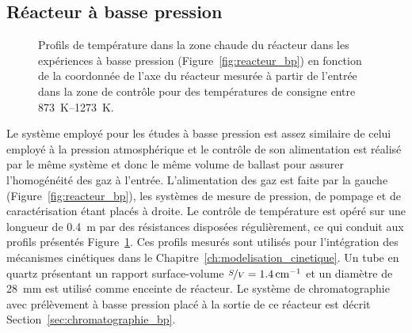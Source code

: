 \subsection{Réacteur à basse pression}
\label{sec:reacteur_bp}

\begin{figure}[!b]
  \centering{}
  
  \caption{\label{fig:temperature_profiles_bp}Profils de température dans la zone chaude du réacteur dans les expériences à basse pression (Figure~\ref{fig:reacteur_bp}) en fonction de la coordonnée de l'axe du réacteur mesurée à partir de l'entrée dans la zone de contrôle pour des températures de consigne entre \SIrange{873}{1273}{\kelvin}.}
\end{figure} 

Le système employé pour les études à basse pression est assez similaire de celui employé à la pression atmosphérique et le contrôle de son alimentation est réalisé par le même système et donc le même volume de ballast pour assurer l'homogénéité des gaz à l'entrée. L'alimentation des gaz est faite par la gauche (Figure~\ref{fig:reacteur_bp}), les systèmes de mesure de pression, de pompage et de caractérisation étant placés à droite. Le contrôle de température est opéré sur une longueur de \SI{0,4}{\metre} par des résistances disposées régulièrement, ce qui conduit aux profils présentés Figure~\ref{fig:temperature_profiles_bp}. Ces profils mesurés sont utilisés pour l'intégration des mécanismes cinétiques dans le Chapitre~\ref{ch:modelisation_cinetique}. Un tube en quartz présentant un rapport surface-volume $\nicefrac{S}{V}=\SI{1,4}{\per\centi\metre}$ et un diamètre de \SI{28}{\milli\metre} est utilisé comme enceinte de réacteur. Le système de chromatographie avec prélèvement à basse pression placé à la sortie de ce réacteur est décrit Section~\ref{sec:chromatographie_bp}.

